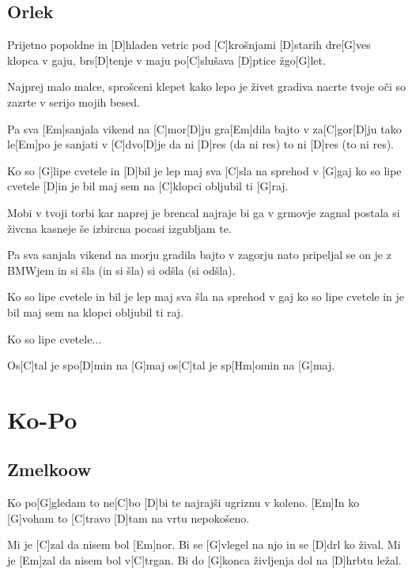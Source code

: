 \documentclass[a4paper,12pt]{article}
\begin{document}
\begin{multicols}{2}
\subsection*{Orlek}
\begin{guitar}
[G]      

Prijetno popoldne in [D]hladen vetric
pod [C]krošnjami [D]starih dre[G]ves
klopca v gaju, brs[D]tenje v maju
po[C]slušava [D]ptice žgo[G]let.


Najprej malo malce, sprošceni klepet
kako lepo je živet
gradiva nacrte tvoje oči so zazrte
v serijo mojih besed.


Pa sva [Em]sanjala vikend na [C]mor[D]ju
gra[Em]dila bajto v za[C]gor[D]ju
tako le[Em]po je sanjati v [C]dvo[D]je
da ni [D]res (da ni res) 
to ni [D]res (to ni res).
 

Ko so [G]lipe cvetele in [D]bil je lep maj
sva [C]sla na sprehod v [G]gaj 
ko so lipe cvetele [D]in je bil maj 
sem na [C]klopci obljubil ti [G]raj.


Mobi v tvoji torbi kar naprej je brencal
najraje bi ga v grmovje zagnal
postala si živcna kasneje še izbircna
pocasi izgubljam te.


Pa sva sanjala vikend na morju
gradila bajto v zagorju
nato pripeljal se on je z BMWjem
in si šla (in si šla) 
si odšla (si odšla).


Ko so lipe cvetele in bil je lep maj
sva šla na sprehod v gaj
ko so lipe cvetele in je bil maj
sem na klopci obljubil ti raj.


Ko so lipe cvetele...


Os[C]tal je spo[D]min na [G]maj
os[C]tal je sp[Hm]omin na [G]maj.

\end{guitar}
\section{Ko-Po}
\subsection*{Zmelkoow}
\begin{guitar}
[Em G C D Em]

Ko po[G]gledam to ne[C]bo 
[D]bi te najrajši ugriznu v koleno. 
[Em]In ko [G]voham to [C]travo 
[D]tam na vrtu nepokošeno.


Mi je [C]zal da nisem bol [Em]nor. 
Bi se [G]vlegel na njo in se [D]drl ko žival. 
Mi je [Em]zal da nisem bol v[C]trgan. 
Bi do [G]konca življenja dol na [D]hrbtu ležal.



\end{guitar}
\end{multicols}
\end{document}
